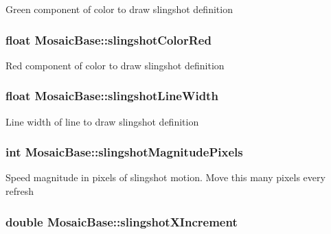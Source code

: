 \label{class_mosaic_base_a8b48adbc5cc23b8960ae0cd2974c631e}
Green component of color to draw slingshot definition \hypertarget{class_mosaic_base_aaf5affe6645477a71b08d9a7250db9a9}{
\subsubsection[{slingshotColorRed}]{\setlength{\rightskip}{0pt plus 5cm}float {\bf MosaicBase::slingshotColorRed}}}
\label{class_mosaic_base_aaf5affe6645477a71b08d9a7250db9a9}
Red component of color to draw slingshot definition \hypertarget{class_mosaic_base_a575b5ec3d304ec28fea8cec362110adc}{
\subsubsection[{slingshotLineWidth}]{\setlength{\rightskip}{0pt plus 5cm}float {\bf MosaicBase::slingshotLineWidth}}}
\label{class_mosaic_base_a575b5ec3d304ec28fea8cec362110adc}
Line width of line to draw slingshot definition \hypertarget{class_mosaic_base_a9c134c7473ad9884d1b63e7029485036}{
\subsubsection[{slingshotMagnitudePixels}]{\setlength{\rightskip}{0pt plus 5cm}int {\bf MosaicBase::slingshotMagnitudePixels}}}
\label{class_mosaic_base_a9c134c7473ad9884d1b63e7029485036}
Speed magnitude in pixels of slingshot motion. Move this many pixels every refresh \hypertarget{class_mosaic_base_a1a8e2dce7bdb32457491c8037e72001e}{
\subsubsection[{slingshotXIncrement}]{\setlength{\rightskip}{0pt plus 5cm}double {\bf MosaicBase::slingshotXIncrement}}}
